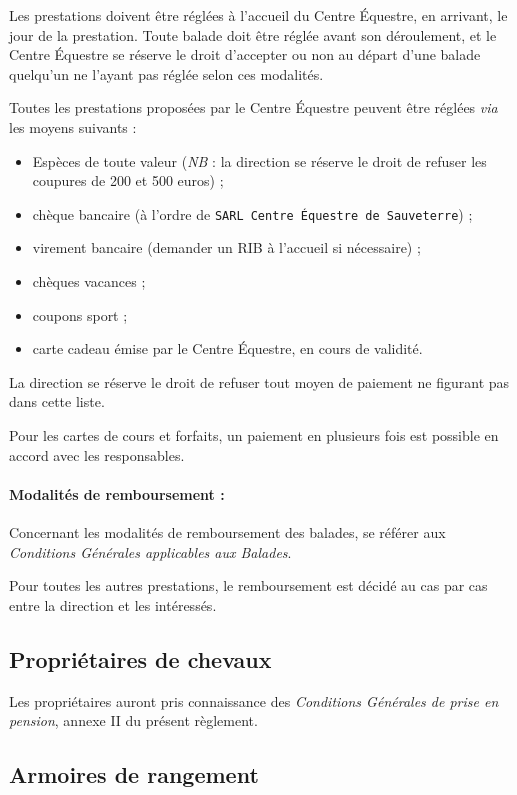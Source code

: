 \documentclass[11pt,a4paper]{article}
\begin{document}
Les prestations doivent être réglées à l'accueil du Centre Équestre, en arrivant, le jour de la prestation.
Toute balade doit être réglée avant son déroulement, et le Centre Équestre se réserve le droit d'accepter ou non au départ d'une balade quelqu'un ne l'ayant pas réglée selon ces modalités.

Toutes les prestations proposées par le Centre Équestre peuvent être réglées \textit{via} les moyens suivants :
\begin{itemize}[leftmargin=50pt]
  \item
  Espèces de toute valeur (\textit{NB} : la direction se réserve le droit de refuser les coupures de 200 et 500 euros) ;
  \item
  chèque bancaire (à l'ordre de \texttt{SARL Centre Équestre de Sauveterre}) ;
  \item
  virement bancaire (demander un RIB à l'accueil si nécessaire) ;
  \item
  chèques vacances ;
  \item
  coupons sport ;
	\item carte cadeau émise par le Centre Équestre, en cours de validité.
\end{itemize}

La direction se réserve le droit de refuser tout moyen de paiement ne figurant pas dans cette liste.

Pour les cartes de cours et forfaits, un paiement en plusieurs fois est possible en accord avec les responsables.

\paragraph[Modalités de remboursement :  ]{Modalités de remboursement :\\}
Concernant les modalités de remboursement des balades, se référer aux \textit{Conditions Générales applicables aux Balades}.

Pour toutes les autres prestations, le remboursement est décidé au cas par cas entre la direction et les intéressés.


\subsection{Propriétaires de chevaux}\label{subsec:proprietaires-de-chevaux}
Les propriétaires auront pris connaissance des \textit{Conditions Générales de prise en pension}, annexe II du présent règlement.


\subsection{Armoires de rangement}\label{subsec:armoires-de-rangement}
\end{document}
